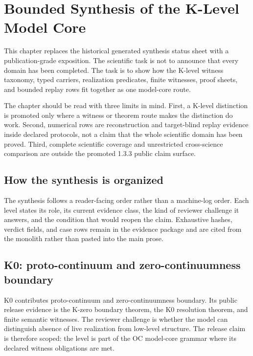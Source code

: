 \section{Bounded Synthesis of the K-Level Model Core}

\label{sec:oc-core-1-3-unified-synthesis}

This chapter replaces the historical generated synthesis status sheet with a publication-grade exposition. The scientific task is not to announce that every domain has been completed. The task is to show how the K-level witness taxonomy, typed carriers, realization predicates, finite witnesses, proof sheets, and bounded replay rows fit together as one model-core route.


The chapter should be read with three limits in mind. First, a K-level distinction is promoted only where a witness or theorem route makes the distinction do work. Second, numerical rows are reconstruction and target-blind replay evidence inside declared protocols, not a claim that the whole scientific domain has been proved. Third, complete scientific coverage and unrestricted cross-science comparison are outside the promoted 1.3.3 public claim surface.


\subsection{How the synthesis is organized}

The synthesis follows a reader-facing order rather than a machine-log order. Each level states its role, its current evidence class, the kind of reviewer challenge it answers, and the condition that would reopen the claim. Exhaustive hashes, verdict fields, and case rows remain in the evidence package and are cited from the monolith rather than pasted into the main prose.


\subsection{K0: proto-continuum and zero-continuumness boundary}

K0 contributes proto-continuum and zero-continuumness boundary. Its public release evidence is the K-zero boundary theorem, the K0 resolution theorem, and finite semantic witnesses. The reviewer challenge is whether the model can distinguish absence of live realization from low-level structure. The release claim is therefore scoped: the level is part of the OC model-core grammar where its declared witness obligations are met.


